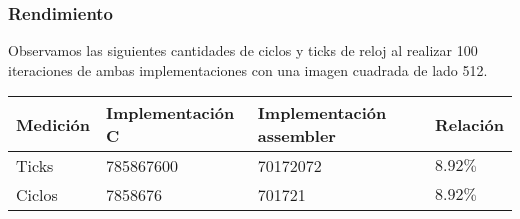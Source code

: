 \subsubsection{Rendimiento}

Observamos las siguientes cantidades de ciclos y ticks de reloj al realizar 100 iteraciones de ambas implementaciones con una imagen cuadrada de lado 512.
\begin{center}
    \begin{tabular}{|l|l|l|l|}
        \hline
        Medición & Implementación C & Implementación assembler & Relación \\
        \hline
        Ticks    & 785867600      & 70172072               & $8.92\%$ \\
        Ciclos   & 7858676        & 701721                 & $8.92\%$ \\
        \hline
    \end{tabular}
\end{center}
